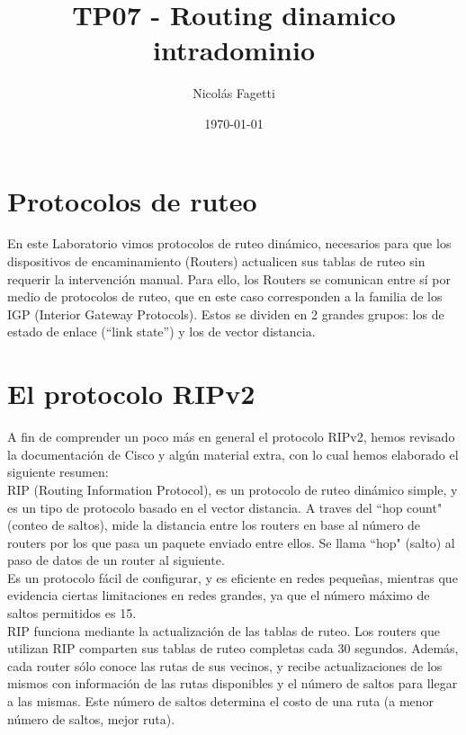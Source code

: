 \documentclass{article}
\title{TP07 - Routing dinamico intradominio}
\author{Nicolás Fagetti}
\date{\today}
\begin{document}
\maketitle

\section{Protocolos de ruteo}

En este Laboratorio vimos protocolos de ruteo din\'amico, necesarios para que los dispositivos de encaminamiento (Routers) actualicen sus tablas de ruteo sin requerir la intervenci\'on manual. Para ello, los Routers se comunican entre s\'i por medio de protocolos de ruteo, que en este caso corresponden a la familia de los IGP (Interior Gateway Protocols). Estos se dividen en 2 grandes grupos: los de estado de enlace (``link state'') y los de vector distancia.

\section{El protocolo RIPv2}

A fin de comprender un poco m\'as en general el protocolo RIPv2, hemos revisado la documentaci\'on de Cisco y alg\'un material extra, con lo cual hemos elaborado el siguiente resumen: \\

RIP (Routing Information Protocol), es un protocolo de ruteo din\'amico simple, y es un tipo de protocolo basado en el vector distancia. A traves del ``hop count" (conteo de saltos), mide la distancia entre los routers en base al n\'umero de routers por los que pasa un paquete enviado entre ellos. Se llama ``hop" (salto) al paso de datos de un router al siguiente. \\

Es un protocolo f\'acil de configurar, y es eficiente en redes pequeñas, mientras que evidencia ciertas limitaciones en redes grandes, ya que el n\'umero m\'aximo de saltos permitidos es 15. \\

RIP funciona mediante la actualizaci\'on de las tablas de ruteo. Los routers que utilizan RIP comparten sus tablas de ruteo completas cada 30 segundos. Adem\'as, cada router s\'olo conoce las rutas de sus vecinos, y recibe actualizaciones de los mismos con informaci\'on de las rutas disponibles y el n\'umero de saltos para llegar a las mismas. Este n\'umero de saltos determina el costo de una ruta (a menor n\'umero de saltos, mejor ruta). \\
\end{document}

